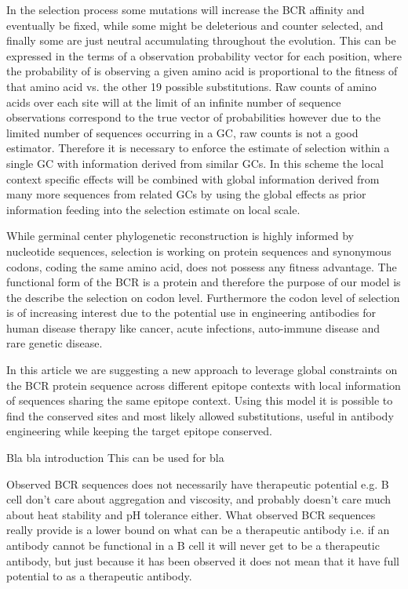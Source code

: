 In the selection process some mutations will increase the BCR affinity and eventually be fixed, while some might be deleterious and counter selected, and finally some are just neutral accumulating throughout the evolution.
This can be expressed in the terms of a observation probability vector for each position, where the probability of is observing a given amino acid is proportional to the fitness of that amino acid vs.
the other 19 possible substitutions.
Raw counts of amino acids over each site will at the limit of an infinite number of sequence observations correspond to the true vector of probabilities however due to the limited number of sequences occurring in a GC, raw counts is not a good estimator.
Therefore it is necessary to enforce the estimate of selection within a single GC with information derived from similar GCs.
In this scheme the local context specific effects will be combined with global information derived from many more sequences from related GCs by using the global effects as prior information feeding into the selection estimate on local scale.

While germinal center phylogenetic reconstruction is highly informed by nucleotide sequences, selection is working on protein sequences and synonymous codons, coding the same amino acid, does not possess any fitness advantage.
The functional form of the BCR is a protein and therefore the purpose of our model is the describe the selection on codon level.
Furthermore the codon level of selection is of increasing interest due to the potential use in engineering antibodies for human disease therapy like cancer, acute infections, auto-immune disease and rare genetic disease.

In this article we are suggesting a new approach to leverage global constraints on the BCR protein sequence across different epitope contexts with local information of sequences sharing the same epitope context.
Using this model it is possible to find the conserved sites and most likely allowed substitutions, useful in antibody engineering while keeping the target epitope conserved.












Bla bla introduction
This can be used for bla 


Observed BCR sequences does not necessarily have therapeutic potential e.g. B cell don't care about aggregation and viscosity, and probably doesn't care much about heat stability and pH tolerance either.
What observed BCR sequences really provide is a lower bound on what can be a therapeutic antibody i.e. if an antibody cannot be functional in a B cell it will never get to be a therapeutic antibody, but just because it has been observed it does not mean that it have full potential to as a therapeutic antibody.



